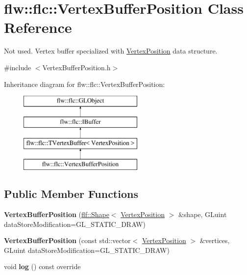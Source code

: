 \hypertarget{classflw_1_1flc_1_1VertexBufferPosition}{}\section{flw\+:\+:flc\+:\+:Vertex\+Buffer\+Position Class Reference}
\label{classflw_1_1flc_1_1VertexBufferPosition}


Not used. Vertex buffer specialized with \hyperlink{structflw_1_1flc_1_1VertexPosition}{Vertex\+Position} data structure.  




{\ttfamily \#include $<$Vertex\+Buffer\+Position.\+h$>$}

Inheritance diagram for flw\+:\+:flc\+:\+:Vertex\+Buffer\+Position\+:\begin{figure}[H]
\begin{center}
\leavevmode
\includegraphics[height=4.000000cm]{classflw_1_1flc_1_1VertexBufferPosition}
\end{center}
\end{figure}
\subsection*{Public Member Functions}
\begin{DoxyCompactItemize}
\item 
{\bfseries Vertex\+Buffer\+Position} (\hyperlink{classflw_1_1flf_1_1Shape}{flf\+::\+Shape}$<$ \hyperlink{structflw_1_1flc_1_1VertexPosition}{Vertex\+Position} $>$ \&shape, G\+Luint data\+Store\+Modification=G\+L\+\_\+\+S\+T\+A\+T\+I\+C\+\_\+\+D\+R\+AW)\hypertarget{classflw_1_1flc_1_1VertexBufferPosition_a80e18a764f80682dc6ce996f46fbf53d}{}\label{classflw_1_1flc_1_1VertexBufferPosition_a80e18a764f80682dc6ce996f46fbf53d}

\item 
{\bfseries Vertex\+Buffer\+Position} (const std\+::vector$<$ \hyperlink{structflw_1_1flc_1_1VertexPosition}{Vertex\+Position} $>$ \&vertices, G\+Luint data\+Store\+Modification=G\+L\+\_\+\+S\+T\+A\+T\+I\+C\+\_\+\+D\+R\+AW)\hypertarget{classflw_1_1flc_1_1VertexBufferPosition_aa34e4b891964a21e42b94ded3841c3ee}{}\label{classflw_1_1flc_1_1VertexBufferPosition_aa34e4b891964a21e42b94ded3841c3ee}

\item 
void {\bfseries log} () const override\hypertarget{classflw_1_1flc_1_1VertexBufferPosition_ac1d3f306fcd045c6418d40849469d585}{}\label{classflw_1_1flc_1_1VertexBufferPosition_ac1d3f306fcd045c6418d40849469d585}

\end{DoxyCompactItemize}
